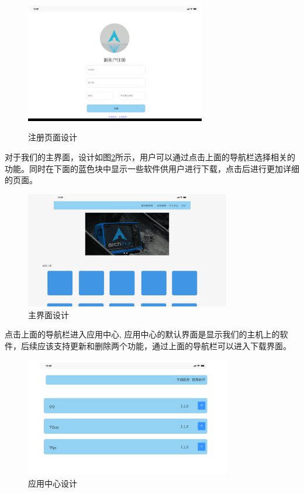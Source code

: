 \documentclass[supercite]{Experimental_Report}
\theoremstyle{definition}
\begin{document}
\begin{figure}[!h]
    \caption{注册页面设计}
    \centering
    \includegraphics[width=0.7\textwidth]{images/register.png}
    \label{register}
\end{figure}
\newpage
对于我们的主界面，设计如图\ref{main}所示，用户可以通过点击上面的导航栏选择相关的功能。同时在下面的蓝色块中显示一些软件供用户进行下载，点击后进行更加详细的页面。
\begin{figure}[!h]
    \centering
    \includegraphics[width=0.8\textwidth]{images/main.png}
    \caption{主界面设计}
    \label{main}
\end{figure}

点击上面的导航栏进入应用中心, 应用中心的默认界面是显示我们的主机上的软件，后续应该支持更新和删除两个功能，通过上面的导航栏可以进入下载界面。
\begin{figure}[!h]
    \centering
    \includegraphics[width=0.8\textwidth]{./images/app.png}
    \caption{应用中心设计}
\end{figure}
\end{document}
